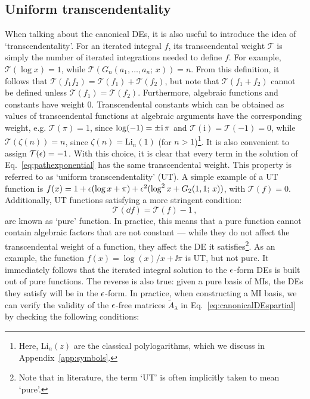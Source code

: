 \documentclass[main.tex]{subfiles}
\begin{document}
\subsection{Uniform transcendentality} \label{sec:UT}
When talking about the canonical DEs, it is also useful to introduce the idea of `transcendentality'. For an iterated integral $f$, its transcendental weight $\mathcal{T}$ is simply the number of iterated integrations needed to define $f$\cite{Henn:2013pwa}. For example, $\mathcal{T}(\log x) = 1$, while $\mathcal{T}(G_n(a_1, \ldots, a_n;\, x)) = n$. From this definition, it follows that $\mathcal{T}(f_1 f_2) = \mathcal{T}(f_1) + \mathcal{T}(f_2)$, but note that $\mathcal{T}(f_1 + f_2)$ cannot be defined unless $\mathcal{T}(f_1) = \mathcal{T}(f_2)$. Furthermore, algebraic functions and constants have weight 0. Transcendental constants which can be obtained as values of transcendental functions at algebraic arguments have the corresponding weight, e.g. $\mathcal{T}(\pi) = 1$, since $\log (-1) = \pm \mathrm{i}\, \pi$ and $\mathcal{T}(\mathrm{i}) = \mathcal{T}(-1) = 0$, while $\mathcal{T}(\zeta(n)) = n$, since $\zeta(n) = \text{Li}_n(1)$ (for $n>1$)\footnote{Here, $\text{Li}_n(z)$ are the classical polylogarithms, which we discuss in Appendix~\ref{app:symbols}.}. It is also convenient to assign $\mathcal{T}(\epsilon)=-1$. With this choice, it is clear that every term in the solution of Eq.~\ref{eq:pathexponential} has the same transcendental weight. This property is referred to as `uniform transcendentality' (UT). A simple example of a UT function is $f(x) = 1 + \epsilon (\log x + \pi) + \epsilon^2 (\log^2 x + G_2(1, 1;\, x))$, with $\mathcal{T}(f) = 0$. Additionally, UT functions satisfying a more stringent condition:
\begin{equation} \label{eq:purecondition}
    \mathcal{T}(\dd f) = \mathcal{T}(f) - 1\,,
\end{equation}
are known as `pure' function. In practice, this means that a pure function cannot contain algebraic factors that are not constant --- while they do not affect the transcendental weight of a function, they affect the DE it satisfies\footnote{Note that in literature, the term `UT' is often implicitly taken to mean `pure'.}. As an example, the function $f(x) = \log(x)/x + \ii \pi$ is UT, but not pure. It immediately follows that the iterated integral solution to the $\epsilon$-form DEs is built out of pure functions. The reverse is also true: given a pure basis of MIs, the DEs they satisfy will be in the $\epsilon$-form. In practice, when constructing a MI basis, we can verify the validity of the $\epsilon$-free matrices $\tilde{A}_\lambda$ in Eq.~\ref{eq:canonicalDEspartial} by checking the following conditions:
\end{document}
